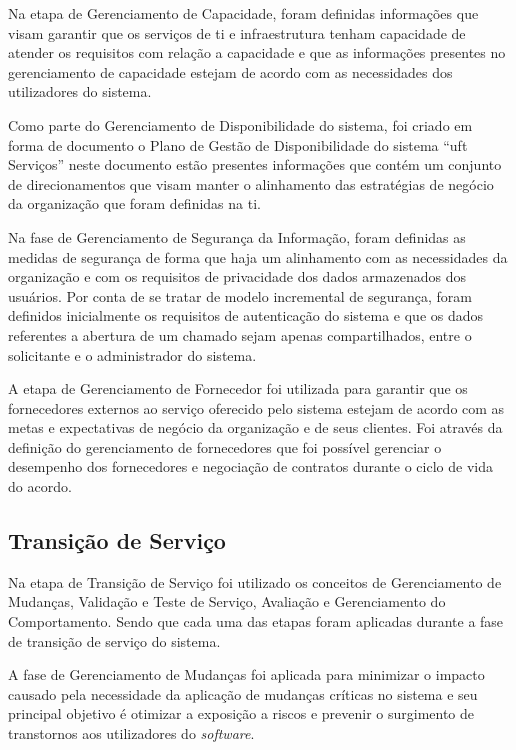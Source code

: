 Na etapa de Gerenciamento de Capacidade, foram definidas informações que visam garantir que os serviços de \acrshort{ti} e infraestrutura tenham capacidade de atender os requisitos com relação a capacidade e que as informações presentes no gerenciamento de capacidade estejam de acordo com as necessidades dos utilizadores do sistema.

Como parte do Gerenciamento de Disponibilidade do sistema, foi criado em forma de documento o Plano de Gestão de Disponibilidade do sistema ``\acrshort{uft} Serviços'' neste documento estão presentes informações que contém um conjunto de direcionamentos que visam manter o alinhamento das estratégias de negócio da organização que foram definidas na \acrshort{ti}.

Na fase de Gerenciamento de Segurança da Informação, foram definidas as medidas de segurança de forma que haja um alinhamento com as necessidades da organização e com os requisitos de privacidade dos dados armazenados dos usuários. Por conta de se tratar de modelo incremental de segurança, foram definidos inicialmente os requisitos de autenticação do sistema e que os dados referentes a abertura de um chamado sejam apenas compartilhados, entre o solicitante e o administrador do sistema.

A etapa de Gerenciamento de Fornecedor foi utilizada para garantir que os fornecedores externos ao serviço oferecido pelo sistema estejam de acordo com as metas e expectativas de negócio da organização e de seus clientes. Foi através da definição do gerenciamento de fornecedores que foi possível gerenciar o desempenho dos fornecedores e negociação de contratos durante o ciclo de vida do acordo.

\subsection*{Transição de Serviço}

\noindent Na etapa de Transição de Serviço foi utilizado os conceitos de Gerenciamento de Mudanças, Validação e Teste de Serviço, Avaliação e Gerenciamento do Comportamento. Sendo que cada uma das etapas foram aplicadas durante a fase de transição de serviço do sistema.

A fase de Gerenciamento de Mudanças foi aplicada para minimizar o impacto causado pela necessidade da aplicação de mudanças críticas no sistema e seu principal objetivo é otimizar a exposição a riscos e prevenir o surgimento de transtornos aos utilizadores do \textit{software}.

